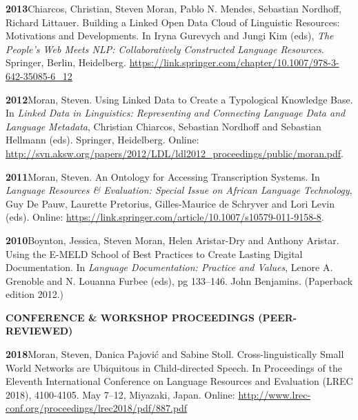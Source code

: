 \documentclass[11pt]{article}
\newcommand{\hangpara}{
 \setlength{\parindent}{0in} %
 \hangindent=0.42in %
}
\begin{document}
\vskip 6pt
\hangpara
{\bf 2013}\hspace{1ex}Chiarcos, Christian, Steven Moran, Pablo N. Mendes, Sebastian Nordhoff, Richard Littauer. Building a Linked Open Data Cloud of Linguistic Resources: Motivations and Developments. In Iryna Gurevych and Jungi Kim (eds), {\it The People's Web Meets NLP: Collaboratively Constructed Language Resources}. Springer, Berlin, Heidelberg. \url{https://link.springer.com/chapter/10.1007/978-3-642-35085-6_12} %


\vskip 6pt
\hangpara
{\bf 2012}\hspace{1ex}Moran, Steven. Using Linked Data to Create a Typological Knowledge Base. In {\it Linked Data in Linguistics: Representing and Connecting Language Data and Language Metadata}, Christian Chiarcos, Sebastian Nordhoff and Sebastian Hellmann (eds). Springer, Heidelberg. Online: \url{http://svn.aksw.org/papers/2012/LDL/ldl2012_proceedings/public/moran.pdf}.

\vskip 6pt
\hangpara
{\bf 2011}\hspace{1ex}Moran, Steven. An Ontology for Accessing Transcription Systems. In {\it Language Resources \& Evaluation: Special Issue on African Language Technology}, Guy De Pauw, Laurette Pretorius, Gilles-Maurice de Schryver and Lori Levin (eds). Online: \url{https://link.springer.com/article/10.1007/s10579-011-9158-8}.%

\vskip 6pt
\hangpara
{\bf 2010}\hspace{1ex}Boynton, Jessica, Steven Moran, Helen Aristar-Dry and Anthony Aristar. Using the E-MELD School of Best Practices to Create Lasting Digital Documentation. In {\it Language Documentation: Practice and Values}, Lenore A. Grenoble and N. Louanna Furbee (eds), pg 133--146. John Benjamins. (Paperback edition 2012.)


\vskip 20pt
\begin{flushleft}
{\bf CONFERENCE \& WORKSHOP PROCEEDINGS (PEER-REVIEWED)}
\end{flushleft}


\hangpara
{\bf 2018}\hspace{1ex}Moran, Steven, Danica Pajovi{\'c} and Sabine Stoll. Cross-linguistically Small World Networks are Ubiquitous in Child-directed Speech. In Proceedings of the Eleventh International Conference on Language Resources and Evaluation (LREC 2018), 4100-4105. May 7--12, Miyazaki, Japan. Online: \url{http://www.lrec-conf.org/proceedings/lrec2018/pdf/887.pdf}
\end{document}
